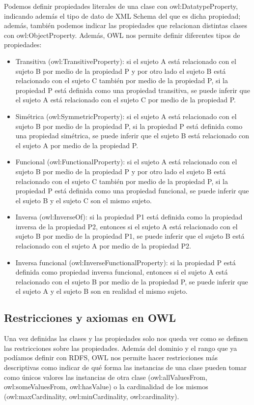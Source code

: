 Podemos definir propiedades literales de una clase con owl:DatatypeProperty, indicando además el tipo de dato de XML Schema del que es dicha propiedad; además, también podemos indicar las propiedades que relacionan distintas clases con owl:ObjectProperty. Además, OWL  nos permite definir diferentes tipos de propiedades:

	\begin{itemize}
		\item Transitiva (owl:TransitiveProperty): si el sujeto A está relacionado con el sujeto B por medio de la propiedad P y por otro lado el sujeto B está relacionado con el sujeto C también por medio de la propiedad P, si la propiedad P está definida como una propiedad transitiva, se puede inferir que el sujeto A está relacionado con el sujeto C por medio de la propiedad P.
		\item Simétrica (owl:SymmetricProperty): si el sujeto A está relacionado con el sujeto B por medio de la propiedad P, si la propiedad P está definida como una propiedad simétrica, se puede inferir que el sujeto B está relacionado con el sujeto A por medio de la propiedad P.
		\item Funcional (owl:FunctionalProperty): si el sujeto A está relacionado con el sujeto B por medio de la propiedad P y por otro lado el sujeto B está relacionado con el sujeto C también por medio de la propiedad P, si la propiedad P está definida como una propiedad funcional, se puede inferir que el sujeto B y el sujeto C son el mismo sujeto.
		\item Inversa (owl:InverseOf): si la propiedad P1 está definida como la propiedad inversa de la propiedad P2, entonces si el sujeto A está relacionado con el sujeto B por medio de la propiedad P1, se puede inferir que el sujeto B está relacionado con el sujeto A por medio de la propiedad P2.
		\item Inversa funcional (owl:InverseFunctionalProperty): si la propiedad P está definida como propiedad inversa funcional, entonces si el sujeto A está relacionado con el sujeto B por medio de la propiedad P, se puede inferir que el sujeto A y el sujeto B son en realidad el mismo sujeto.
	\end{itemize}

\subsection{Restricciones y axiomas en OWL}	
Una vez definidas las clases y las propiedades solo nos queda ver como se definen las restricciones sobre las propiedades. Además del dominio y el rango que ya podíamos definir con RDFS, OWL nos permite hacer restricciones más descriptivas como indicar de qué forma las instancias de una clase pueden tomar como únicos valores las instancias de otra clase (owl:allValuesFrom, owl:someValuesFrom, owl:hasValue) o la cardinalidad de los mismos (owl:maxCardinality, owl:minCardinality, owl:cardinality).

